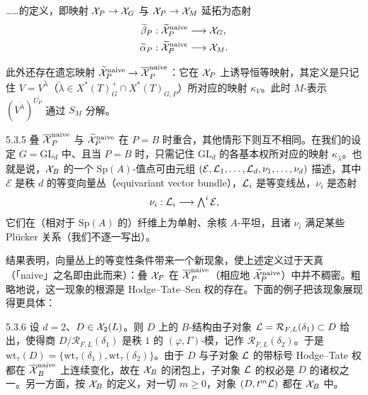 

……的定义，即映射 $\mathcal{X}_P\to\mathcal{X}_G$ 与 $\mathcal{X}_P\to\mathcal{X}_M$ 延拓为态射
\[
\begin{aligned}
\widetilde\beta_P&:\widetilde{\mathcal{X}}_P^{\mathrm{naive}}\longrightarrow\mathcal{X}_G,\\
\widetilde\alpha_P&:\widetilde{\mathcal{X}}_P^{\mathrm{naive}}\longrightarrow\mathcal{X}_M.
\end{aligned}
\]

此外还存在遗忘映射 $\widetilde{\mathcal{X}}_P^{\mathrm{naive}}\to\overline{\mathcal{X}}_P^{\mathrm{naive}}$：它在 $\mathcal{X}_P$ 上诱导恒等映射，其定义是只记住 $V=V^{\check\lambda}$（$\check\lambda\in X^*(T)^{+}_{G}\cap X^*(T)_{G,P}$）所对应的映射 $\kappa_V$。此时 $M$-表示 $(V^{\check\lambda})^{U_P}$ 通过 $S_M$ 分解。

\begin{rem}{5.3.5}\label{rem:a4-5-3-5}
叠 $\overline{\mathcal{X}}_P^{\mathrm{naive}}$ 与 $\widetilde{\mathcal{X}}_P^{\mathrm{naive}}$ 在 $P=B$ 时重合，其他情形下则互不相同。在我们的设定 $G=\mathrm{GL}_d$ 中、且当 $P=B$ 时，只需记住 $\mathrm{GL}_d$ 的各基本权所对应的映射 $\kappa_{\check\lambda}$。也就是说，$\mathcal{X}_B$ 的一个 $\mathrm{Sp}(A)$-值点可由元组 $(\mathcal E,\mathcal{L}_1,\dots,\mathcal{L}_d,\nu_1,\dots,\nu_d)$ 描述，其中 $\mathcal E$ 是秩 $d$ 的等变向量丛（equivariant vector bundle），$\mathcal{L}_i$ 是等变线丛，$\nu_i$ 是态射
\[
\nu_i:\mathcal{L}_i\longrightarrow\textstyle\bigwedge^{i}\mathcal E,
\]
它们在（相对于 $\mathrm{Sp}(A)$ 的）纤维上为单射、余核 $A$-平坦，且诸 $\nu_i$ 满足某些 Plücker 关系（我们不逐一写出）。
\end{rem}

结果表明，向量丛上的等变性条件带来一个新现象，使上述定义过于天真（「naive」之名即由此而来）：叠 $\mathcal{X}_P$ 在 $\overline{\mathcal{X}}_P^{\mathrm{naive}}$（相应地 $\widetilde{\mathcal{X}}_P^{\mathrm{naive}}$）中并不稠密。粗略地说，这一现象的根源是 Hodge–Tate–Sen 权的存在。下面的例子把该现象展现得更具体：

\begin{exam}{5.3.6}\label{exam:a4-5-3-6}
设 $d=2$、$D\in\mathcal{X}_2(L)$。则 $D$ 上的 $B$-结构由子对象 $\mathcal{L}=\mathcal R_{F,L}(\delta_1)\subset D$ 给出，使得商 $D/\mathcal R_{F,L}(\delta_1)$ 是秩 $1$ 的 $(\varphi,\Gamma)$-模，记作 $\mathcal R_{F,L}(\delta_2)$。于是 $\mathrm{wt}_\tau(D)=\{\mathrm{wt}_\tau(\delta_1),\mathrm{wt}_\tau(\delta_2)\}$。由于 $D$ 与子对象 $\mathcal{L}$ 的带标号 Hodge–Tate 权都在 $\overline{\mathcal{X}}_B^{\mathrm{naive}}$ 上连续变化，故在 $\mathcal{X}_B$ 的闭包上，子对象 $\mathcal{L}$ 的权必是 $D$ 的诸权之一。另一方面，按 $\mathcal{X}_B$ 的定义，对一切 $m\ge0$，对象 $(D,t^m\mathcal{L})$ 都在 $\mathcal{X}_B$ 中。
\end{exam}

